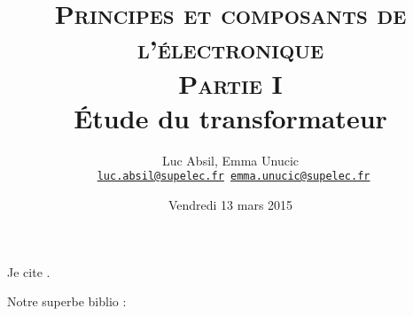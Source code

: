 \documentclass[fontsize=14pt, DIV=calc, a4paper]{scrartcl}
\title{\textsc{Principes et composants de l'électronique\\
\medskip
\normalsize Partie I}\\
\Huge \textbf{Étude du transformateur}}
\author{Luc Absil, Emma Unucic\\
\bigskip
{\tt \small
\href{mailto:luc.absil@supelec.fr}{luc.absil@supelec.fr}
\href{mailto:emma.unucic@supelec.fr}{emma.unucic@supelec.fr}}}
\date{Vendredi 13 mars 2015}
\begin{document}
\maketitle

Je cite \cite{blagues}.

Notre superbe biblio :
 
\end{document}
